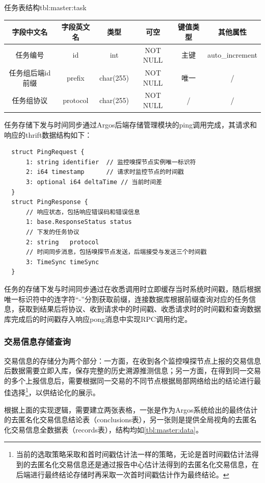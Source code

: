 \documentclass[supercite]{HustGraduPaper}
\newcommand{\rtbl}[1]{\autoref{tbl:#1}}
\theoremstyle{definition}
\begin{document}
\begin{generaltab}{任务表结构}{tbl:master:task}
  \begin{tabular}{c|ccccc}
    \toprule
    字段中文名          & 字段英文名 & 类型       & 可空      & 键值类型 & 其他属性\\
    \midrule
    任务编号           & id       & int         & NOT NULL & 主键 & auto\_{}increment\\
    任务组后端id前缀    & prefix   & char(255) & NOT NULL & 唯一 & /\\
    任务组协议         & protocol & char(255)  & NOT NULL & /   & /\\
    \bottomrule
  \end{tabular}
\end{generaltab}

任务存储下发与时间同步通过Argos后端存储管理模块的ping调用完成，其请求和响应的thrift数据结构如下：
\begin{verbatim}
  struct PingRequest {
      1: string identifier  // 监控嗅探节点实例唯一标识符
      2: i64 timestamp      // 请求时监控节点的时间戳
      3: optional i64 deltaTime // 当前时间差
  }
  struct PingResponse {
      // 响应状态，包括响应错误码和错误信息
      1: base.ResponseStatus status 
      // 下发的任务协议
      2: string   protocol  
      // 时间同步消息，包括嗅探节点发送，后端接受与发送三个时间戳
      3: TimeSync timeSync  
  }
\end{verbatim}

任务的存储下发与时间同步通过在收悉调用时立即缓存当时系统时间戳，随后根据唯一标识符中的连字符“-”分割获取前缀，连接数据库根据前缀查询对应的任务信息，获取到结果后将协议、收到请求中的时间戳、收悉请求时的时间戳和查询数据库完成后的时间戳存入响应pong消息中实现RPC调用约定。
\subsubsection{交易信息存储查询}
交易信息的存储分为两个部分：一方面，在收到各个监控嗅探节点上报的交易信息后数据需要立即入库，保存完整的历史溯源推测信息；另一方面，在得到同一交易的多个上报信息后，需要根据同一交易的不同节点根据局部网络给出的结论进行最佳选择\footnote{当前的选取策略采取和首时间戳估计法一样的策略，无论是首时间戳估计法得到的去匿名化交易信息还是通过报告中心估计法得到的去匿名化交易信息，在后端进行最终结论存储时再采取一次首时间戳估计作为最终结论。}，以供结论化的展示。

根据上面的实现逻辑，需要建立两张表格，一张是作为Argos系统给出的最终估计的去匿名化交易信息结论表（conclusions表），另一张则是提供全局视角的去匿名化交易信息全数据表（records表），结构均如\rtbl{master:data}。
\end{document}
